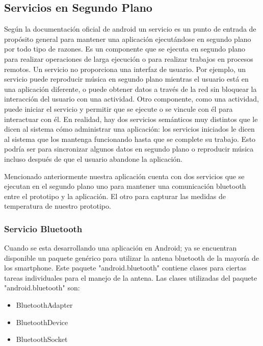 \subsection{Servicios en Segundo Plano}

\par 
Según la documentación oficial de android un servicio es un punto de entrada de propósito general para mantener una aplicación ejecutándose en segundo plano por todo tipo de razones. Es un componente que se ejecuta en segundo plano para realizar operaciones de larga ejecución o para realizar trabajos en procesos remotos. Un servicio no proporciona una interfaz de usuario. Por ejemplo, un servicio puede reproducir música en segundo plano mientras el usuario está en una aplicación diferente, o puede obtener datos a través de la red sin bloquear la interacción del usuario con una actividad. Otro componente, como una actividad, puede iniciar el servicio y permitir que se ejecute o se vincule con él para interactuar con él. En realidad, hay dos servicios semánticos muy distintos que le dicen al sistema cómo administrar una aplicación: los servicios iniciados le dicen al sistema que los mantenga funcionando hasta que se complete su trabajo. Esto podría ser para sincronizar algunos datos en segundo plano o reproducir música incluso después de que el usuario abandone la aplicación.\cite{androidapp}

\par \noindent
Mencionado anteriormente nuestra aplicación cuenta con dos servicios que se ejecutan en el segundo plano uno para mantener una comunicación bluetooth entre el prototipo y la aplicación. El otro para capturar las medidas de temperatura de nuestro prototipo. 

\subsubsection{Servicio Bluetooth}

\par \noindent
Cuando se esta desarrollando una aplicación en Android; ya se encuentran disponible un paquete genérico para utilizar la antena bluetooth de la mayoría de los smartphone. Este paquete "android.bluetooth" contiene clases para ciertas tareas individuales para el manejo de la antena. Las clases utilizadas del paquete "android.bluetooth" son:

\begin{itemize}
	\item BluetoothAdapter
	
	\item BluetoothDevice
	
	\item BluetoothSocket
\end{itemize}

